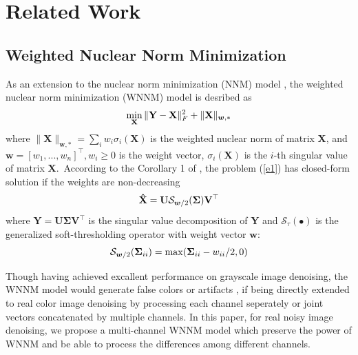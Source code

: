 \documentclass[10pt,twocolumn,letterpaper,sort&compress]{article}
\begin{document}
\section{Related Work}

\subsection{Weighted Nuclear Norm Minimization}
As an extension to the nuclear norm minimization (NNM) model \cite{cai2010singular}, the weighted nuclear norm minimization (WNNM) model \cite{wnnm} is desribed as 
\vspace{-3mm}
\begin{equation}
\label{e1}
\vspace{-3mm}
\min_{\mathbf{X}}\|\mathbf{Y}-\mathbf{X}\|_{F}^{2}
+
\|\mathbf{X}\|_{\bm{w},*}
\end{equation}
where $\|\mathbf{X}\|_{\bm{w},*}=\sum_{i}w_{i}\sigma_{i}(\mathbf{X})$ is the weighted nuclear norm of matrix $\mathbf{X}$, and $\bm{w}=[w_{1},...,w_{n}]^{\top}, w_{i}\ge 0$ is the weight vector, $\sigma_{i}(\mathbf{X})$ is the $i$-th singular value of matrix $\mathbf{X}$.\ According to the Corollary 1 of \cite{wnnmijcv}, the problem (\ref{e1}) has closed-form solution if the weights are non-decreasing
\vspace{-3mm}  
\begin{equation}
\label{e2}
\vspace{-3mm}
\mathbf{\hat{X}}
=
\mathbf{U}
\mathcal{S}_{\bm{w}/2}
(\mathbf{\Sigma})
\mathbf{V}^{\top}
\end{equation}
where $\mathbf{Y}=\mathbf{U}\mathbf{\Sigma}\mathbf{V}^{\top}$ is the singular value decomposition \cite{eckart1936approximation} of $\mathbf{Y}$ and 
$\mathcal{S}_{\tau}(\bullet)$ is the generalized soft-thresholding operator with weight vector $\bm{w}$:
\vspace{-3mm}
\begin{equation}
\label{e3}
\vspace{-3mm}
\mathcal{S}_{\bm{w}/2}
(\mathbf{\Sigma}_{ii})
=
\max(\mathbf{\Sigma}_{ii}-w_{ii}/2, 0)
\end{equation}

Though having achieved excallent performance on grayscale image denoising, the WNNM model would generate false colors or artifacts \cite{mairal2008sparse}, if being directly extended to real color image denoising by processing each channel seperately or joint vectors concatenated by multiple channels. In this paper, for real noisy image denoising, we propose a multi-channel WNNM model which preserve the power of WNNM and be able to process the differences among different channels.
\end{document}
